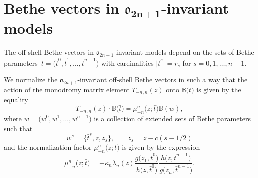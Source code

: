 \documentclass[pdftex]{sigma}
\newcommand{\bt}{{\bar t}}
\newcommand{\bw}{\bar w}
\theoremstyle{definition}
\def\BB{{\mathbb{B}}}
\begin{document}
\section[Bethe vectors in o\_2n+1-invariant models]{Bethe vectors in $\boldsymbol{\mathfrak{o}_{2n+1}}$-invariant models}\label{sect:oN}

The off-shell Bethe vectors in $\mathfrak{o}_{2n+1}$-invariant models
depend on the sets of Bethe parameters~${\bt=\bigl(\bt^0,\bt^1,\dots,\bt^{n-1}\bigr)}$
with cardinalities $\big|\bt^s\big|=r_s$ for $s=0,1,\dots,n-1$.


We normalize the $\mathfrak{o}_{2n+1}$-invariant off-shell Bethe vectors in such a way
that the action of the monodromy matrix element $T_{-n,n}(z)$ onto
$\BB\bigl(\bt\bigr)$ is given by the equality
\begin{equation}\label{Bz1}
T_{-n,n}(z)\cdot\BB\bigl(\bt\bigr)= \mu_{-n}^n\bigl(z;\bt\bigr) \BB(\bw) ,
\end{equation}
where
$\bw=\bigl(\bw^0,\bw^1,\dots,\bw^{n-1}\bigr)$ is a collection of extended
sets of Bethe parameters such that
\begin{equation}\label{Bz2}
\bw^s=\bigl\{\bt^s,z,z_s\bigr\},\qquad z_s=z-c(s-1/2)
\end{equation}
and the normalization factor $\mu_{-n}^n\bigl(z;\bt\bigr)$ is given by the expression
\begin{equation}\label{Bz3}
\mu_{-n}^n\bigl(z;\bt\bigr)=-\kappa_n \lambda_n(z)
\frac{g\bigl(z_1,\bar t^0\bigr)}{h\bigl(z,\bar t^{0}\bigr)}
\frac{h\bigl(z,\bar t^{n-1}\bigr)}{g\bigl(z_n,\bar t^{n-1}\bigr)} .
\end{equation}
\end{document}
